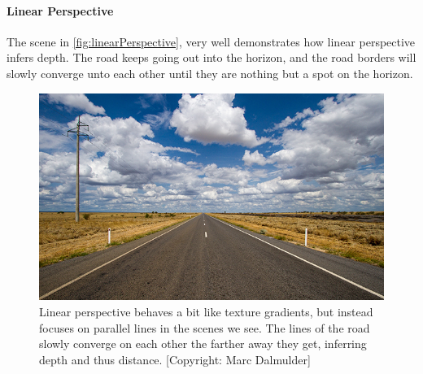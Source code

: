 			\paragraph{Linear Perspective}
				The scene in \autoref{fig:linearPerspective}, very well demonstrates how linear perspective infers depth. The road keeps going out into the horizon, and the road borders will slowly converge unto each other until they are nothing but a spot on the horizon.
				\begin{figure}[H]
					\centering
					\includegraphics[width=0.8\linewidth]{figure/linear}
					\caption{Linear perspective behaves a bit like texture gradients, but instead focuses on parallel lines in the scenes we see. The lines of the road slowly converge on each other the farther away they get, inferring depth and thus distance. [Copyright: Marc Dalmulder]}
					\label{fig:linearPerspective}
				\end{figure}
